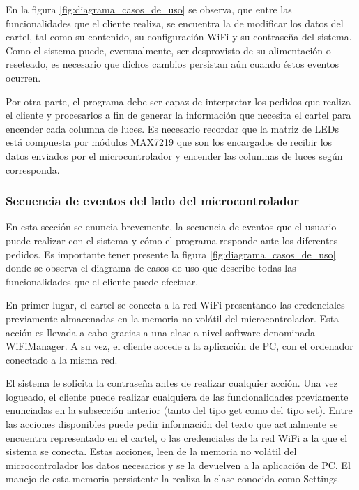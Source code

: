 En la figura \ref{fig:diagrama_casos_de_uso} se observa, que entre las funcionalidades que el cliente realiza, se encuentra la de modificar los datos del cartel, tal como su contenido, su configuración WiFi y su contraseña del sistema.
Como el sistema puede, eventualmente, ser desprovisto de su alimentación o reseteado, es necesario que dichos cambios persistan aún cuando éstos eventos ocurren.

Por otra parte, el programa debe ser capaz de interpretar los pedidos que realiza el cliente y procesarlos a fin de generar la información que necesita el cartel para encender cada columna de luces.
Es necesario recordar que la matriz de LEDs está compuesta por módulos MAX7219 que son los encargados de recibir los datos enviados por el microcontrolador y encender las columnas de luces según corresponda.



\subsubsection{Secuencia de eventos del lado del microcontrolador}

En esta sección se enuncia brevemente, la secuencia de eventos que el usuario puede realizar con el sistema y cómo el programa responde ante los diferentes pedidos.
Es importante tener presente la figura \ref{fig:diagrama_casos_de_uso} donde se observa el diagrama de casos de uso que describe todas las funcionalidades que el cliente puede efectuar.

En primer lugar, el cartel se conecta a la red WiFi presentando las credenciales previamente almacenadas en la memoria no volátil del microcontrolador.
Esta acción es llevada a cabo gracias a una clase a nivel software denominada WiFiManager.
A su vez, el cliente accede a la aplicación de PC, con el ordenador conectado a la misma red.

El sistema le solicita la contraseña antes de realizar cualquier acción.
Una vez logueado, el cliente puede realizar cualquiera de las funcionalidades previamente enunciadas en la subsección anterior (tanto del tipo get como del tipo set).
Entre las acciones disponibles puede pedir información del texto que actualmente se encuentra representado en el cartel, o las credenciales de la red WiFi a la que el sistema se conecta.
Estas acciones, leen de la memoria no volátil del microcontrolador los datos necesarios y se la devuelven a la aplicación de PC.
El manejo de esta memoria persistente la realiza la clase conocida como Settings.

